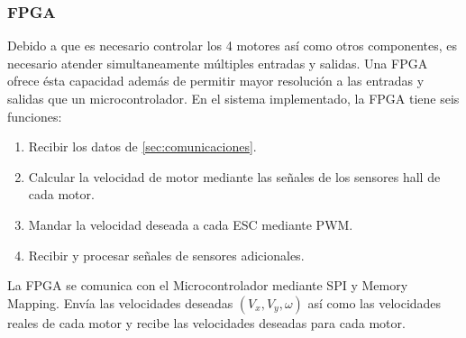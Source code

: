\documentclass[twocolumn,10pt]{amrob}
\begin{document}

\subsubsection*{FPGA}
\label{sec:fpga}
Debido a que es necesario controlar los 4 motores así como otros componentes, es necesario atender simultaneamente múltiples entradas y salidas. Una FPGA ofrece ésta capacidad además de permitir mayor resolución a las entradas y salidas que un microcontrolador. En el sistema implementado, la FPGA tiene seis funciones:
\begin{enumerate}
  \item Recibir los datos de \ref{sec:comunicaciones}.
  \item Calcular la velocidad de motor mediante las señales de los sensores hall de cada motor.
  \item Mandar la velocidad deseada a cada ESC mediante PWM.
  \item Recibir y procesar señales de sensores adicionales.
\end{enumerate}
La FPGA se comunica con el Microcontrolador mediante SPI y Memory Mapping. Envía las velocidades deseadas $(V_x,V_y,\omega)$ así como las velocidades reales de cada motor y recibe las velocidades deseadas para cada motor.\par
\end{document}
